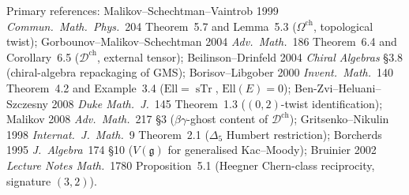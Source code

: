 \begin{remark}
Primary references: Malikov--Schechtman--Vaintrob 1999 \emph{Commun.\ Math.\ Phys.}~204 Theorem~5.7 and Lemma~5.3 ($\Omega^{\mathrm{ch}}$, topological twist); Gorbounov--Malikov--Schechtman 2004 \emph{Adv.\ Math.}~186 Theorem~6.4 and Corollary~6.5 ($\mathcal D^{\mathrm{ch}}$, external tensor); Beilinson--Drinfeld 2004 \emph{Chiral Algebras} \S3.8 (chiral-algebra repackaging of GMS); Borisov--Libgober 2000 \emph{Invent.\ Math.}~140 Theorem~4.2 and Example~3.4 ($\mathrm{Ell}=\operatorname{sTr}$, $\mathrm{Ell}(E)=0$); Ben-Zvi--Heluani--Szczesny 2008 \emph{Duke Math.\ J.}~145 Theorem~1.3 ($(0,2)$-twist identification); Malikov 2008 \emph{Adv.\ Math.}~217 \S3 ($\beta\gamma$-ghost content of $\mathcal D^{\mathrm{ch}}$); Gritsenko--Nikulin 1998 \emph{Internat.\ J.\ Math.}~9 Theorem~2.1 ($\Delta_5$ Humbert restriction); Borcherds 1995 \emph{J.\ Algebra}~174 \S10 ($V(\mathfrak g)$ for generalised Kac--Moody); Bruinier 2002 \emph{Lecture Notes Math.}~1780 Proposition~5.1 (Heegner Chern-class reciprocity, signature $(3,2)$).
\end{remark}
